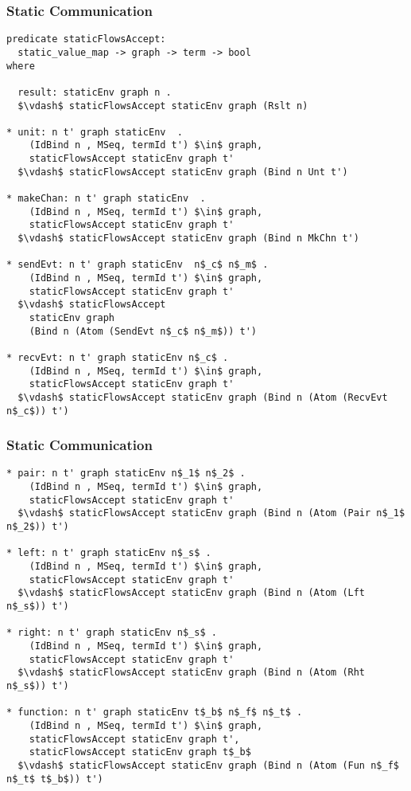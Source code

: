 \documentclass{beamer}
\begin{document}
\begin{frame}[fragile]
	\frametitle{Static Communication}
\begin{lstlisting}[language=logic, mathescape]
predicate staticFlowsAccept:
  static_value_map -> graph -> term -> bool
where

  result: staticEnv graph n .
  $\vdash$ staticFlowsAccept staticEnv graph (Rslt n)

* unit: n t' graph staticEnv  .
    (IdBind n , MSeq, termId t') $\in$ graph,
    staticFlowsAccept staticEnv graph t'
  $\vdash$ staticFlowsAccept staticEnv graph (Bind n Unt t')

* makeChan: n t' graph staticEnv  .
    (IdBind n , MSeq, termId t') $\in$ graph,
    staticFlowsAccept staticEnv graph t'
  $\vdash$ staticFlowsAccept staticEnv graph (Bind n MkChn t')

* sendEvt: n t' graph staticEnv  n$_c$ n$_m$ .
    (IdBind n , MSeq, termId t') $\in$ graph, 
    staticFlowsAccept staticEnv graph t'
  $\vdash$ staticFlowsAccept
    staticEnv graph
    (Bind n (Atom (SendEvt n$_c$ n$_m$)) t')

* recvEvt: n t' graph staticEnv n$_c$ .
    (IdBind n , MSeq, termId t') $\in$ graph,
    staticFlowsAccept staticEnv graph t'
  $\vdash$ staticFlowsAccept staticEnv graph (Bind n (Atom (RecvEvt n$_c$)) t')
\end{lstlisting}
\end{frame}


\begin{frame}[fragile]
	\frametitle{Static Communication}
\begin{lstlisting}[language=logic, mathescape]
* pair: n t' graph staticEnv n$_1$ n$_2$ .
    (IdBind n , MSeq, termId t') $\in$ graph,
    staticFlowsAccept staticEnv graph t'
  $\vdash$ staticFlowsAccept staticEnv graph (Bind n (Atom (Pair n$_1$ n$_2$)) t')

* left: n t' graph staticEnv n$_s$ .
    (IdBind n , MSeq, termId t') $\in$ graph,
    staticFlowsAccept staticEnv graph t'
  $\vdash$ staticFlowsAccept staticEnv graph (Bind n (Atom (Lft n$_s$)) t')

* right: n t' graph staticEnv n$_s$ .
    (IdBind n , MSeq, termId t') $\in$ graph,
    staticFlowsAccept staticEnv graph t'
  $\vdash$ staticFlowsAccept staticEnv graph (Bind n (Atom (Rht n$_s$)) t')

* function: n t' graph staticEnv t$_b$ n$_f$ n$_t$ .
    (IdBind n , MSeq, termId t') $\in$ graph,
    staticFlowsAccept staticEnv graph t', 
    staticFlowsAccept staticEnv graph t$_b$
  $\vdash$ staticFlowsAccept staticEnv graph (Bind n (Atom (Fun n$_f$ n$_t$ t$_b$)) t')
\end{lstlisting}
\end{frame}
\end{document}
